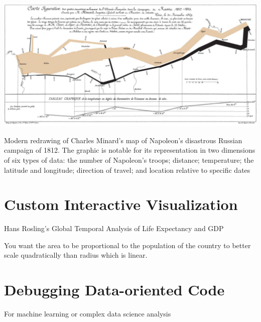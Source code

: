\documentclass[11pt]{article}
\theoremstyle{definition}
\begin{document}
\includegraphics[width=\textwidth]{37.png}

Modern redrawing of Charles Minard's map of Napoleon's disastrous Russian campaign of
1812. The graphic is notable for its representation in two dimensions of six types of data: the
number of Napoleon's troops; distance; temperature; the latitude and longitude; direction of
travel; and location relative to specific dates

\section{Custom Interactive Visualization}
Hans Rosling's Global Temporal Analysis of Life Expectancy and GDP

You want the area to be proportional to the population of the country to better scale quadratically than radius which is linear. 

\section{Debugging
Data-oriented Code}
For machine learning or complex
data science analysis
\end{document}
